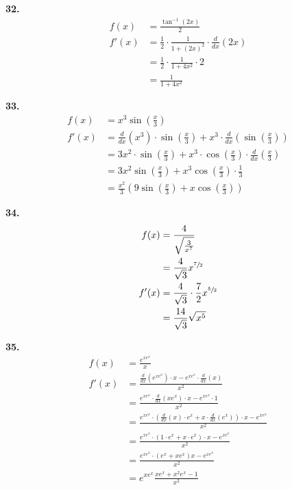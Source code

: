 \documentclass[10pt,oneside,]{book}
\theoremstyle{plain}
\theoremstyle{definition}
\numberwithin{equation}{section}
\newcommand{\fe}[2]{#1\mathopen{}\left(#2\right)\mathclose{}}
\newcommand{\fd}[1]{#1'}
\newcommand{\lzoo}[2]{{\frac{d}{d#1}}{\left(#2\right)}}
\begin{document}
\par\smallskip
\noindent\textbf{32.}\quad{}\begin{align*}
\fe{f}{x}&=\frac{\fe{\tan^{-1}}{2x}}{2}\\
\fe{\fd{f}}{x}&=\frac{1}{2}\cdot\frac{1}{1+(2x)^2}\cdot\lzoo{x}{2x}\\
&=\frac{1}{2}\cdot\frac{1}{1+4x^2}\cdot2\\
&=\frac{1}{1+4x^2}
\end{align*}%
\par\smallskip
\noindent\textbf{33.}\quad{}\begin{align*}
\fe{f}{x}&=x^3\fe{\sin}{\frac{x}{3}}\\
\fe{\fd{f}}{x}&=\lzoo{x}{x^3}\cdot\fe{\sin}{\frac{x}{3}}+x^3\cdot\lzoo{x}{\fe{\sin}{\frac{x}{3}}}\\
&=3x^2\cdot\fe{\sin}{\frac{x}{3}}+x^3\cdot\fe{\cos}{\frac{x}{3}}\cdot\lzoo{x}{\frac{x}{3}}\\
&=3x^2\fe{\sin}{\frac{x}{3}}+x^3\fe{\cos}{\frac{x}{3}}\cdot\frac{1}{3}\\
&=\frac{x^2}{3}\left(9\fe{\sin}{\frac{x}{3}}+x\fe{\cos}{\frac{x}{3}}\right)
\end{align*}%
\par\smallskip
\noindent\textbf{34.}\quad{}\begin{align*}
\fe{f}{x}&=\frac{4}{\sqrt{\frac{3}{x^7}}}\\
&=\frac{4}{\sqrt{3}}x^{\sfrac{7}{2}}\\
\fe{\fd{f}}{x}&=\frac{4}{\sqrt{3}}\cdot\frac{7}{2}x^{\sfrac{5}{2}}\\
&=\frac{14}{\sqrt{3}}\sqrt{x^5}
\end{align*}%
\par\smallskip
\noindent\textbf{35.}\quad{}\begin{align*}
\fe{f}{x}&=\frac{e^{xe^x}}{x}\\
\fe{\fd{f}}{x}&=\frac{\lzoo{x}{e^{xe^x}}\cdot x-e^{xe^x}\cdot\lzoo{x}{x}}{x^2}\\
&=\frac{e^{xe^x}\cdot\lzoo{x}{xe^x}\cdot x-e^{xe^x}\cdot1}{x^2}\\
&=\frac{e^{xe^x}\cdot\left(\lzoo{x}{x}\cdot e^x+x\cdot\lzoo{x}{e^x}\right)\cdot x-e^{xe^x}}{x^2}\\
&=\frac{e^{xe^x}\cdot\left(1\cdot e^x+x\cdot e^x\right)\cdot x-e^{xe^x}}{x^2}\\
&=\frac{e^{xe^x}\cdot\left(e^x+xe^x\right) x-e^{xe^x}}{x^2}\\
&=e^{xe^x}\frac{xe^x+x^2e^x-1}{x^2}
\end{align*}%
\end{document}
